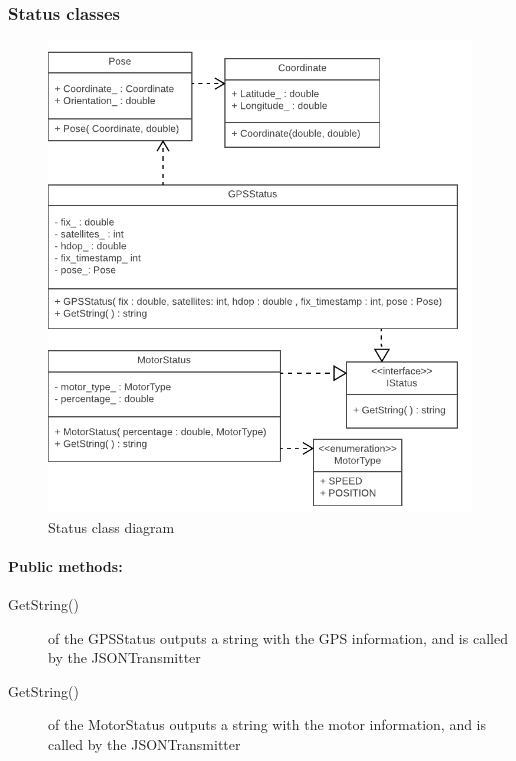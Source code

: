 \subsubsection{Status classes}

\begin{figure}[H]
\centering
\includegraphics[width=1\linewidth]{Images/Design/Status_class_diagram}
\caption{Status class diagram}
\label{fig:status}
\end{figure}

\paragraph{Public methods:}
\begin{adjustwidth}{2.5em}{0pt}\begin{description}
		\item [GetString()] of the GPSStatus outputs a string with the GPS information, and is called by the JSONTransmitter
		\item [GetString()] of the MotorStatus outputs a string with the motor information, and is called by the JSONTransmitter
\end{description}\end{adjustwidth}

